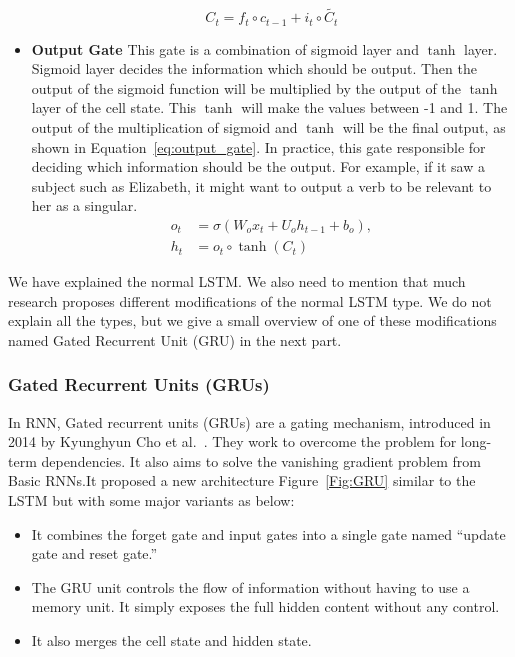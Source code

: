\begin{itemize}
\begin{equation}\label{eq:multiplication_gate}
C_t = f_t \circ c_{t-1} + i_t \circ \widetilde{C_t}
\end{equation}
   
  \item \textbf{Output Gate} This gate is a combination of sigmoid layer and $\tanh$ layer. Sigmoid layer decides the information which should be output. Then the output of the  sigmoid function will be multiplied by the output of the $\tanh$ layer of the cell state. This $\tanh$ will make the values between -1 and 1. The output of the multiplication of sigmoid and $\tanh$ will be the final output, as shown in Equation~\eqref{eq:output_gate}. In practice, this gate responsible for deciding which information should be the output. For example, if it saw a subject such as Elizabeth, it might want to output a verb to be relevant to her as a singular.%
\begin{subequations}\label{eq:output_gate}
\begin{align}
o_t &= \sigma(W_o x_t + U_o h_{t-1} + b_o),\\
h_t &= o_t \circ \tanh(C_t)
\end{align}
\end{subequations}%
\end{itemize}

We have explained the normal LSTM. We also need to mention that much research proposes different modifications of the normal LSTM type. We do not explain all the types, but we give a small overview of one of these modifications named Gated Recurrent Unit (GRU) in the next part.

\subsubsection{Gated Recurrent Units (GRUs)}

In RNN, Gated recurrent units (GRUs) are a gating mechanism, introduced in 2014 by Kyunghyun Cho et al.~\cite{Cho_et_al}. They work to overcome the problem for long-term dependencies. It also aims to solve the vanishing gradient problem from Basic RNNs.It proposed a new architecture Figure~\ref{Fig:GRU} similar to the LSTM but with some major variants as below:

\begin{itemize}
\item It combines the forget gate and input gates into a single gate named “update gate and reset gate.”
\item The GRU unit controls the flow of information without having to use a memory unit. It simply exposes the full hidden content without any control.
\item It also merges the cell state and hidden state.
\end{itemize}%

